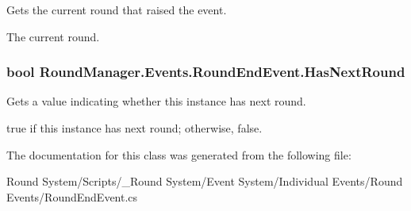 Gets the current round that raised the event. 

The current round.\hypertarget{class_round_manager_1_1_events_1_1_round_end_event_a7dd0fc823f150d965e48e4bfd0ce54be}{}
\subsubsection[{Has\+Next\+Round}]{\setlength{\rightskip}{0pt plus 5cm}bool Round\+Manager.\+Events.\+Round\+End\+Event.\+Has\+Next\+Round\hspace{0.3cm}{\ttfamily [get]}}\label{class_round_manager_1_1_events_1_1_round_end_event_a7dd0fc823f150d965e48e4bfd0ce54be}


Gets a value indicating whether this instance has next round. 

{\ttfamily true} if this instance has next round; otherwise, {\ttfamily false}.

The documentation for this class was generated from the following file\+:\begin{DoxyCompactItemize}
\item 
Round System/\+Scripts/\+\_\+\+Round System/\+Event System/\+Individual Events/\+Round Events/Round\+End\+Event.\+cs\end{DoxyCompactItemize}
